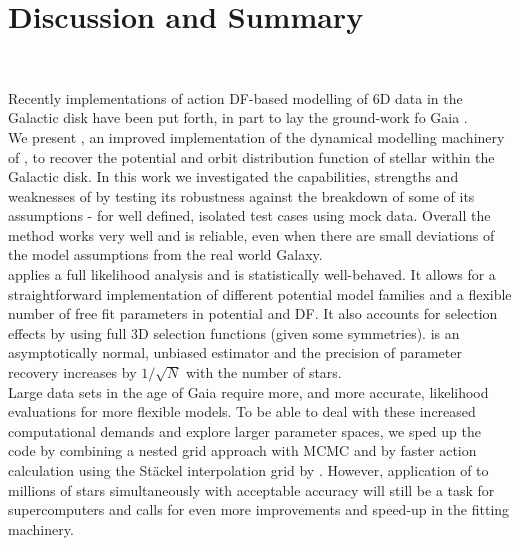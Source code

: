 \section{Discussion and Summary} \label{sec:discussionsummary}

\\

Recently implementations of action DF-based modelling of 6D data in the Galactic disk have been put forth, in part to lay the ground-work fo Gaia \citep{2013ApJ...779..115B,2013MNRAS.433.1411M,2014MNRAS.445.3133P,2015MNRAS.449.3479S}.
 \\We present \RM{}, an improved implementation of the dynamical modelling machinery of \citet{2013ApJ...779..115B}, to recover the potential and orbit distribution function of stellar \MAPs{} within the Galactic disk. In this work we investigated the capabilities, strengths and weaknesses of \RM{} by testing its robustness against the breakdown of some of its assumptions - for well defined, isolated test cases using mock data. Overall the method works very well and is reliable, even when there are small deviations of the model assumptions from the real world Galaxy.
\\\RM{} applies a full likelihood analysis and is statistically well-behaved. It allows for a straightforward implementation of different potential model families and a flexible number of free fit parameters in potential and DF. It also accounts for selection effects by using full 3D selection functions (given some symmetries). \RM{} is an asymptotically normal, unbiased estimator and the precision of parameter recovery increases by $1/\sqrt{N}$ with the number of stars.\\

 Large data sets in the age of Gaia require more, and more accurate, likelihood evaluations for more flexible models. To be able to deal with these increased computational demands and explore larger parameter spaces, we sped up the code by combining a nested grid approach with MCMC and by faster action calculation using the St\"{a}ckel \citep{2012MNRAS.426.1324B} interpolation grid by \citet{2015ApJS..216...29B}. However, application of \RM{} to millions of stars simultaneously with acceptable accuracy will still be a task for supercomputers and calls for even more improvements and speed-up in the fitting machinery.\\

